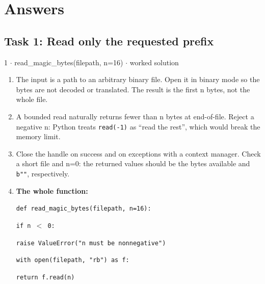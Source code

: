\documentclass[11pt]{article}
\begin{document}
\section{Answers}
\begin{keepsection}\subsection{Task 1: Read only the requested prefix}

\begin{workedbox}{1 \ensuremath{\cdot} read\_magic\_bytes(filepath, n=16) \ensuremath{\cdot} worked solution}
\begin{enumerate}
\item The input is a path to an arbitrary binary file. Open it in binary mode so the bytes are not decoded or translated. The result is the first n bytes, not the whole file.
\item A bounded read naturally returns fewer than n bytes at end-of-file. Reject a negative n: Python treats \texttt{read(-1)} as “read the rest”, which would break the memory limit.
\item Close the handle on success and on exceptions with a context manager. Check a short file and n=0: the returned values should be the bytes available and \texttt{b""}, respectively.
\item {}
\textbf{The whole function:}
\begin{tcolorbox}[colback=Paperblue,colframe=Paperblue,boxrule=0pt,arc=0pt,left=7pt,right=7pt,top=5pt,bottom=5pt]\small\sloppy
\noindent\hspace*{0em}\texttt{def read\_magic\_bytes(filepath, n=16):}\par
\noindent\hspace*{1em}\texttt{if n \ensuremath{<} 0:}\par
\noindent\hspace*{3em}\texttt{raise ValueError("n must be nonnegative")}\par
\noindent\hspace*{1em}\texttt{with open(filepath, "rb") as f:}\par
\noindent\hspace*{3em}\texttt{return f.read(n)}\par
\end{tcolorbox}
\end{enumerate}
\end{workedbox}

\end{keepsection}
\end{document}
